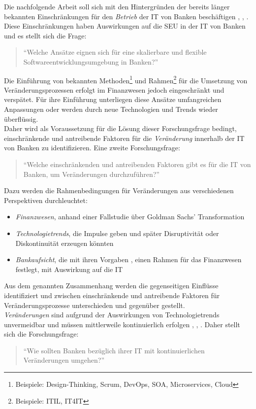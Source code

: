 Die nachfolgende Arbeit soll sich mit den Hintergründen der bereits länger bekannten Einschränkungen für den \emph{Betrieb} der IT von Banken beschäftigen \cite{Brockhoff2006},  \cite{Bussmann2006}, \cite{Gupta:2017}.
Diese Einschränkungen haben Auswirkungen auf die \ac{SEU} in der IT von Banken und es stellt sich die Frage:
\begin{quote}
    \enquote{Welche Ansätze eignen sich für eine skalierbare und flexible Softwareentwicklungsumgebung in Banken?}
\end{quote}
%
Die Einführung von bekannten Methoden\footnote{Beispiele: Design-Thinking, Scrum, DevOps, \ac{SOA}, Microservices, Cloud} und Rahmen\footnote{Beispiele: ITIL, IT4IT} für die Umsetzung von Veränderungsprozessen erfolgt im Finanzwesen jedoch eingeschränkt und verspätet. Für ihre Einführung unterliegen diese Ansätze umfangreichen Anpassungen oder werden durch neue Technologien und Trends wieder überflüssig.
\medskip
\\
Daher wird als Voraussetzung für die Lösung dieser Forschungsfrage bedingt, einschränkende und antreibende Faktoren für die \emph{Veränderung} innerhalb der IT von Banken zu identifizieren. Eine zweite Forschungsfrage:
\begin{quote}
    \enquote{Welche einschränkenden und antreibenden Faktoren gibt es für die IT von Banken, um Veränderungen durchzuführen?}
\end{quote}

Dazu werden die Rahmenbedingungen für Veränderungen aus verschiedenen Perspektiven durchleuchtet:
\begin{itemize}
    \item \emph{Finanzwesen}, anhand einer Fallstudie \cite{Gupta:2017} über Goldman Sachs' Transformation
    \item \emph{Technologietrends}, die Impulse geben und später Disruptivität oder Diskontinuität erzeugen könnten
    \item \emph{Bankaufsicht}, die mit ihren Vorgaben \cite{MaRisk:2017}, \cite{BAIT:2018} einen Rahmen für das Finanzwesen festlegt, mit Auswirkung auf die IT
\end{itemize}
 
Aus dem genannten Zusammenhang werden die gegenseitigen Einflüsse identifiziert und zwischen einschränkende und antreibende Faktoren für Veränderungsprozesse unterschieden und gegenüber gestellt. 
\medskip
\\
\emph{Veränderungen} sind aufgrund der Auswirkungen von Technologietrends unvermeidbar und müssen mittlerweile kontinuierlich erfolgen \cite{Bussmann2006}, \cite{Alt2017}, \cite{Fernandez:2020}. Daher stellt sich die Forschungsfrage: 
\begin{quote}
    \enquote{Wie sollten Banken bezüglich ihrer IT mit kontinuierlichen Veränderungen umgehen?}
\end{quote}

